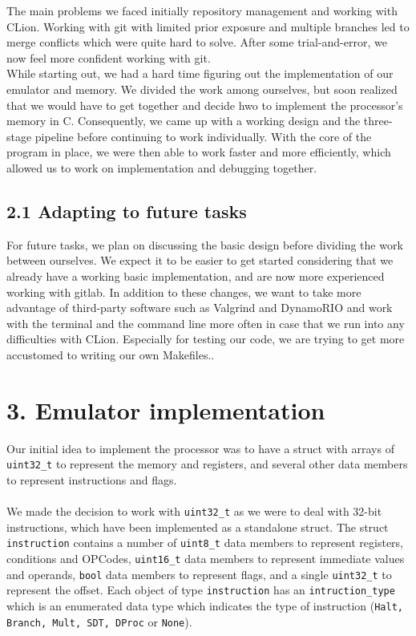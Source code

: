 \documentclass[a4paper, twoside]{report}
\begin{document}
The main problems we faced initially repository management and working with CLion. Working with git with limited prior exposure and multiple branches led to merge conflicts which were quite hard to solve. After some trial-and-error, we now feel more confident working with git. \\ 
While starting out, we had a hard time figuring out the implementation of our emulator and memory. We divided the work among ourselves, but soon realized that we would have to get together and decide hwo to implement the processor's memory in C. Consequently, we came up with a working design and the three-stage pipeline before continuing to work individually. With the core of the program in place, we were then able to work faster and more efficiently, which allowed us to work on implementation and debugging together. 
\subsection*{2.1 Adapting to future tasks}
For future tasks, we plan on discussing the basic design before dividing the work between ourselves. We expect it to be easier to get started considering that we already have a working basic implementation, and are now more experienced working with gitlab. In addition to these changes, we want to take more advantage of third-party software such as Valgrind and DynamoRIO and work with the terminal and the command line more often in case that we run into any difficulties with CLion. Especially for testing our code, we are trying to get more accustomed to writing our own Makefiles..



\section*{}

\section*{3. Emulator implementation}
Our initial idea to implement the processor was to have a struct with arrays of \verb|uint32_t| to represent the memory and registers, and several other data members to represent instructions and flags. \\ \\
We made the decision to work with \verb|uint32_t| as we were to deal with 32-bit instructions, which have been implemented as a standalone struct. The struct \verb|instruction| contains a number of \verb|uint8_t| data members to represent registers, conditions and OPCodes, \verb|uint16_t| data members to represent immediate values and operands, \verb|bool| data members to represent flags, and a single \verb|uint32_t| to represent the offset. Each object of type \verb|instruction| has an \verb|intruction_type| which is an enumerated data type which indicates the type of instruction (\verb|Halt, Branch, Mult, SDT, DProc| or \verb|None|). \\
\end{document}
